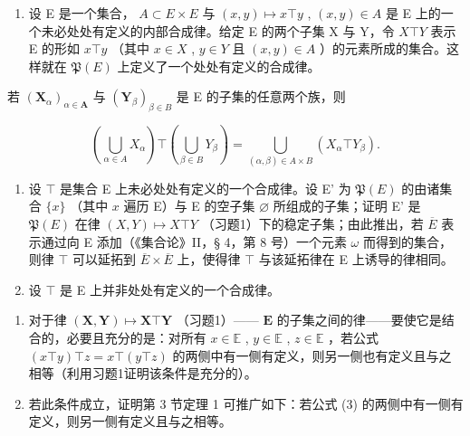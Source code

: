 \BourbakiExercisesSection

\begin{enumerate}
\def\labelenumi{\arabic{enumi}.}
\tightlist
\item
  设 E 是一个集合， \(A \subset E \times E\) 与 \((x, y) \mapsto x \top y\) , \((x, y) \in A\) 是 E 上的一个未必处处有定义的内部合成律。给定 E 的两个子集 X 与 Y，令 \(X \top Y\) 表示 E 的形如 \(x \top y\) （其中 \(x \in X\) , \(y \in Y\) 且 \((x, y) \in A\) ）的元素所成的集合。这样就在 \(\mathfrak{P}(E)\) 上定义了一个处处有定义的合成律。
\end{enumerate}

若 \((\mathbf{X}_{\alpha})_{\alpha \in \mathbf{A}}\) 与 \((\mathbf{Y}_{\beta})_{\beta \in B}\) 是 E 的子集的任意两个族，则

\[
\left(\bigcup_ {\alpha \in A} X _ {\alpha}\right) \top \left(\bigcup_ {\beta \in B} Y _ {\beta}\right) = \bigcup_ {(\alpha , \beta) \in A \times B} (X _ {\alpha} \top Y _ {\beta}).
\]

\begin{enumerate}
\def\labelenumi{\arabic{enumi}.}
\setcounter{enumi}{1}
\item
  设 \(\top\) 是集合 E 上未必处处有定义的一个合成律。设 E' 为 \(\mathfrak{P}(E)\) 的由诸集合 \(\{x\}\) （其中 \(x\) 遍历 E）与 E 的空子集 \(\varnothing\) 所组成的子集；证明 E' 是 \(\mathfrak{P}(E)\) 在律 \((X,Y)\mapsto X\top Y\) （习题1）下的稳定子集；由此推出，若 \(\overline{E}\) 表示通过向 E 添加（《集合论》II，§ 4，第 8 号）一个元素 \(\omega\) 而得到的集合，则律 \(\top\) 可以延拓到 \(\overline{E} \times \overline{E}\) 上，使得律 \(\top\) 与该延拓律在 E 上诱导的律相同。
\item
  设 \(\top\) 是 E 上并非处处有定义的一个合成律。
\end{enumerate}

\begin{enumerate}
\def\labelenumi{(\alph{enumi})}
\item
  对于律 \((\mathbf{X}, \mathbf{Y}) \mapsto \mathbf{X} \top \mathbf{Y}\) （习题1）—— \(\mathbf{E}\) 的子集之间的律——要使它是结合的，必要且充分的是：对所有 \(x \in \mathbb{E}\) , \(y \in \mathbb{E}\) , \(z \in \mathbb{E}\) ，若公式 \((x \top y) \top z = x \top (y \top z)\) 的两侧中有一侧有定义，则另一侧也有定义且与之相等（利用习题1证明该条件是充分的）。
\item
  若此条件成立，证明第 3 节定理 1 可推广如下：若公式 (3) 的两侧中有一侧有定义，则另一侧有定义且与之相等。
\end{enumerate}

